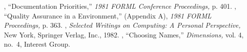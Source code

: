 \begin{references}{9}
 , ``Documentation Priorities,''
\emph{1981 FORML Conference Proceedings,} p. 401.
 , ``Quality Assurance in a \Forth{}
Environment,'' (Appendix A), \emph{1981 FORML Proceedings,} p. 363.
 , \emph{Selected Writings on
Computing: A Personal Perspective,} New York, Springer Verlag, Inc.,
1982.
 , ``Choosing Names,'' \emph{\Forth{} Dimensions,}
vol. 4, no.\ 4, \Forth{} Interest Group.
\end{references}

